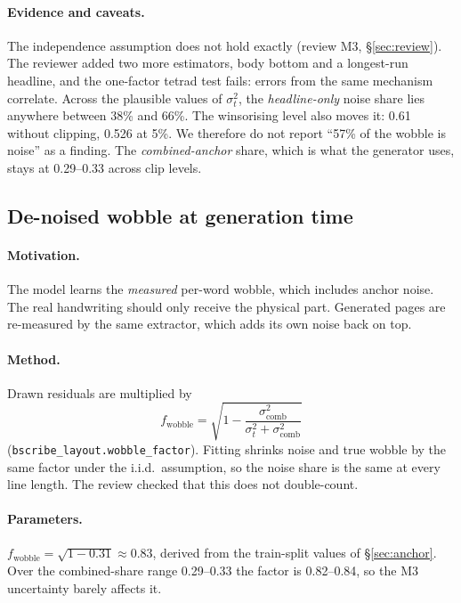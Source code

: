 \documentclass[11pt,a4paper]{article}
\begin{document}
\paragraph{Evidence and caveats.} The independence assumption does not hold
exactly (review M3, \S\ref{sec:review}). The reviewer added two more estimators,
body bottom and a longest-run headline, and the one-factor tetrad test fails:
errors from the same mechanism correlate. Across the plausible values of
$\sigma_t^2$, the \emph{headline-only} noise share lies anywhere between 38\% and
66\%. The winsorising level also moves it: 0.61 without clipping, 0.526 at
5\%. We therefore do not report ``57\% of the wobble is noise'' as a finding.
The \emph{combined-anchor} share, which is what the generator uses, stays at
0.29--0.33 across clip levels.

\subsection{De-noised wobble at generation time}
\label{sec:denoise}
\paragraph{Motivation.} The model learns the \emph{measured} per-word wobble,
which includes anchor noise. The real handwriting should only receive the
physical part. Generated pages are re-measured by the same extractor, which adds
its own noise back on top.

\paragraph{Method.} Drawn residuals are multiplied by
\begin{equation}
f_\text{wobble}=\sqrt{1-\frac{\sigma^2_\text{comb}}{\sigma_t^2+\sigma^2_\text{comb}}}
\end{equation}
(\texttt{bscribe\_layout.wobble\_factor}). Fitting shrinks noise and true
wobble by the same factor under the i.i.d.\ assumption, so the noise share is
the same at every line length. The review checked that this does not
double-count.

\paragraph{Parameters.} $f_\text{wobble}=\sqrt{1-0.31}\approx0.83$, derived
from the train-split values of \S\ref{sec:anchor}. Over the combined-share
range 0.29--0.33 the factor is 0.82--0.84, so the M3 uncertainty barely
affects it.
\end{document}
